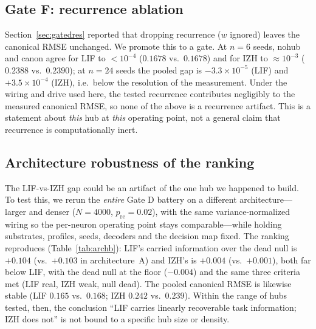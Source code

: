 \documentclass[10pt,a4paper]{article}
\newcommand{\RMSE}{\ensuremath{\mathrm{RMSE}}}
\newcommand{\dfloor}{\ensuremath{\Delta\RMSE_{\mathrm{floor}}}}
\begin{document}
\subsection{Gate F: recurrence ablation}\label{sec:gatef}

Section~\ref{sec:gatedres} reported that dropping recurrence
($w$ ignored) leaves the canonical RMSE unchanged. We promote this to a
gate. At $n=6$ seeds, nohub and canon agree for LIF to $<10^{-4}$
($0.1678$ vs.\ $0.1678$) and for IZH to $\approx10^{-3}$ ($0.2388$
vs.\ $0.2390$); at $n=24$ seeds the pooled gap is $-3.3\times10^{-5}$
(LIF) and $+3.5\times10^{-4}$ (IZH), i.e.\ below the resolution of the
measurement. Under the wiring and drive used here, the tested
recurrence contributes negligibly to the measured canonical RMSE, so
none of the above is a recurrence artifact. This is a statement about
\emph{this} hub at \emph{this} operating point, not a general claim
that recurrence is computationally inert.

\subsection{Architecture robustness of the ranking}\label{sec:archb}
\begin{table}[H]
\centering
\caption{Same Gate D battery (five profiles, six seeds, identical
substrates, decoders and decision map) on a second hub, architecture~B
($N=4000$, $p_{\mathrm{re}}=0.02$, variance-normalized wiring), versus
architecture~A of Sections~\ref{sec:hub}--\ref{sec:gatef}. $\dfloor$ is
the improvement over the mean-predictor floor; ``info$-$null'' subtracts
the matched dead-null floor.}
\label{tab:archb}

\end{table}
The LIF-vs-IZH gap could be an artifact of the one hub we happened to
build. To test this, we rerun the \emph{entire} Gate D battery on a
different architecture---larger and denser ($N=4000$, $p_{\mathrm{re}}=
0.02$), with the same variance-normalized wiring so the per-neuron
operating point stays comparable---while holding substrates, profiles,
seeds, decoders and the decision map fixed. The ranking reproduces
(Table~\ref{tab:archb}): LIF's carried information over the dead null is
$+0.104$ (vs.\ $+0.103$ in architecture~A) and IZH's is $+0.004$
(vs.\ $+0.001$), both far below LIF, with the dead null at the floor
($-0.004$) and the same three criteria met (LIF real, IZH weak, null
dead). The pooled canonical RMSE is likewise stable (LIF $0.165$
vs.\ $0.168$; IZH $0.242$ vs.\ $0.239$). Within the range of hubs tested,
then, the conclusion ``LIF carries linearly recoverable task information;
IZH does not'' is not bound to a specific hub size or density.
\end{document}
